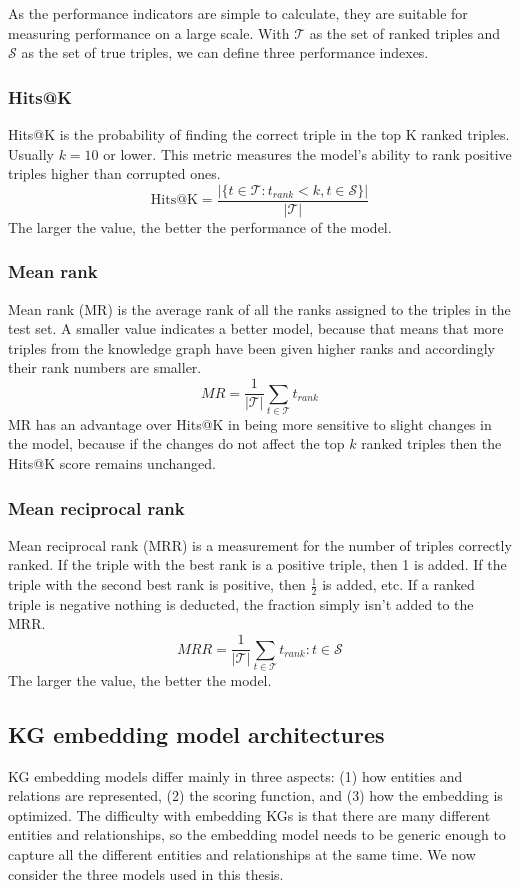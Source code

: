 As the performance indicators are simple to calculate, they are suitable for measuring performance on a large scale. With $\mathcal{T}$ as the set of ranked triples and $\mathcal{S}$ as the set of true triples, we can define three performance indexes.

\subsubsection{Hits@K}
\label{Hits@k}
Hits@K is the probability of finding the correct triple in the top K ranked triples. Usually $k=10$ or lower. This metric measures the model's ability to rank positive triples higher than corrupted ones.
\[\text{Hits@K}=\frac{|\{t\in \mathcal{T} : t_{rank}<k, t \in \mathcal{S}\}|}{|\mathcal{T}|}\]
The larger the value, the better the performance of the model.

\subsubsection{Mean rank}
Mean rank (MR) is the average rank of all the ranks assigned to the triples in the test set. A smaller value indicates a better model, because that means that more triples from the knowledge graph have been given higher ranks and accordingly their rank numbers are smaller.
\[MR=\frac{1}{|\mathcal{T}|}\sum_{t\in\mathcal{T}}t_{rank}\]
MR has an advantage over Hits@K in being more sensitive to slight changes in the  model, because if the changes do not affect the top $k$ ranked triples then the Hits@K score remains unchanged.

\subsubsection{Mean reciprocal rank}
Mean reciprocal rank (MRR) is a measurement for the number of triples correctly ranked. If the triple with the best rank is a positive triple, then 1 is added. If the triple with the second best rank is positive, then $\frac{1}{2}$ is added, etc. If a ranked triple is negative nothing is deducted, the fraction simply isn't added to the MRR.
\[MRR=\frac{1}{|\mathcal{T}|}\sum_{t\in\mathcal{T}}t_{rank} : t\in \mathcal{S}\]
The larger the value, the better the model.
    
\subsection{KG embedding model architectures}
\label{KG_embeddings_section}
KG embedding models differ mainly in three aspects: (1) how entities and relations are represented, (2) the scoring function, and (3) how the embedding is optimized. The difficulty with embedding KGs is that there are many different entities and relationships, so the embedding model needs to be generic enough to capture all the different entities and relationships at the same time. We now consider the three models used in this thesis.

